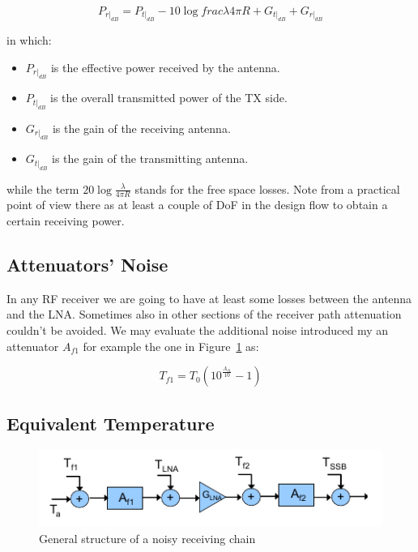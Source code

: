 \begin{equation}	
P_{r|_{dB}} = P_{t|_{dB}} - 10 \log{frac{\lambda}{4\pi R}} + G_{t|_{dB}} + G_{r|_{dB}} 
\end{equation}

in which:

\begin{itemize}
	\item $P_{r|_{dB}}$ is the effective power received by the antenna.
	\item $P_{t|_{dB}}$ is the overall transmitted power of the TX side.
	\item $G_{r|_{dB}}$ is the gain of the receiving antenna.
	\item $G_{t|_{dB}}$ is the gain of the transmitting antenna.
\end{itemize}

while the term $20\log{ \frac{\lambda}{4 \pi R} }$ stands for the free space losses.
Note from a practical point of view there as at least a couple of DoF in the design flow to obtain a certain receiving power.



\subsection{Attenuators' Noise} %
\label{sub:noise_of_attenuators}

In any RF receiver we are going to have at least some losses between the antenna and the LNA. Sometimes also in other sections of the receiver path attenuation couldn't be avoided.
We may evaluate the additional noise introduced my an attenuator $A_{f1}$ for example the one in Figure~\ref{fig:Teq} as:

\begin{equation}
	T_{f1}= T_0 (10^ { \frac {A_{f1}} {10} }-1)
\end{equation}




\subsection{Equivalent Temperature} %
\label{sub:equivalent_temperature}

\begin{figure} [h!]
	\centering
	\includegraphics[scale=1]{Immagini/Teq}
	
	\caption{General structure of a noisy receiving chain}
	\label{fig:Teq}
\end{figure}



